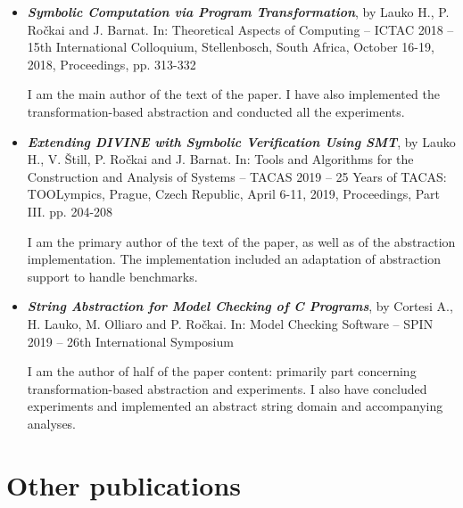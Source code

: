 \begin{itemize}

\item \textbf{\emph{Symbolic Computation via Program Transformation}}, by Lauko
H., P. Ročkai and J. Barnat.  In: Theoretical Aspects of Computing -- ICTAC 2018 --
15th International Colloquium, Stellenbosch, South Africa, October 16-19, 2018,
Proceedings, pp. 313-332~\cite{Lauko2018SymComp}

I am the main author of the text of the paper. I have also implemented the
transformation-based abstraction and conducted all the experiments.

\item \emph{\textbf{Extending \textsf{DIVINE} with Symbolic Verification Using SMT}},
by Lauko H., V. Štill, P. Ročkai and J. Barnat.
In: Tools and Algorithms for the Construction and Analysis of Systems -- TACAS 2019 --
25 Years of TACAS: TOOLympics, Prague, Czech Republic, April 6-11, 2019,
Proceedings, Part III. pp. 204-208~\cite{Lauko2019Sym}

I am the primary author of the text of the paper, as well as of the
abstraction implementation. The implementation included an adaptation of \divine
abstraction support to handle \svcomp benchmarks.

\item \textbf{\emph{String Abstraction for Model Checking of C Programs}},
by Cortesi A., H. Lauko, M. Olliaro and P. Ročkai.
        In: Model Checking Software -- SPIN 2019 -- 26th International Symposium~\cite{Lauko2019String}

I am the author of half of the paper content: primarily part concerning
transformation-based abstraction and experiments. I also have concluded
experiments and implemented an abstract string domain and accompanying
\lart analyses.

\end{itemize}

\section{Other publications}

